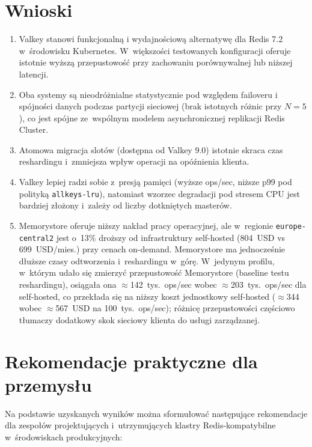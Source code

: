 \section{Wnioski}

\begin{enumerate}
    \item Valkey stanowi funkcjonalną i wydajnościową alternatywę dla Redis 7.2 w~środowisku Kubernetes. W~większości testowanych konfiguracji oferuje istotnie wyższą przepustowość przy zachowaniu porównywalnej lub niższej latencji.
    \item Oba systemy są nieodróżnialne statystycznie pod względem failoveru i spójności danych podczas partycji sieciowej (brak istotnych różnic przy $N = 5$), co jest spójne ze~wspólnym modelem asynchronicznej replikacji Redis Cluster.
    \item Atomowa migracja slotów (dostępna od Valkey 9.0) istotnie skraca czas reshardingu i~zmniejsza wpływ operacji na opóźnienia klienta.
    \item Valkey lepiej radzi sobie z~presją pamięci (wyższe ops/sec, niższe p99 pod polityką \texttt{allkeys-lru}), natomiast wzorzec degradacji pod stresem CPU jest bardziej złożony i~zależy od liczby dotkniętych masterów.
    \item Memorystore oferuje niższy nakład pracy operacyjnej, ale w~regionie \texttt{europe-central2} jest o~13\% droższy od infrastruktury self-hosted (804~USD vs 699~USD/mies.) przy cenach on-demand. Memorystore ma jednocześnie dłuższe czasy odtworzenia i~reshardingu w~górę. W~jedynym profilu, w~którym udało się zmierzyć przepustowość Memorystore (baseline testu reshardingu), osiągała ona $\approx$142~tys.\ ops/sec wobec $\approx$203~tys.\ ops/sec dla self-hosted, co przekłada się na niższy koszt jednostkowy self-hosted ($\approx$344 wobec $\approx$567~USD na 100~tys.\ ops/sec); różnicę przepustowości częściowo tłumaczy dodatkowy skok sieciowy klienta do usługi zarządzanej.
\end{enumerate}

\section{Rekomendacje praktyczne dla przemysłu}

Na podstawie uzyskanych wyników można sformułować następujące rekomendacje dla zespołów projektujących i~utrzymujących klastry Redis-kompatybilne w~środowiskach produkcyjnych:


